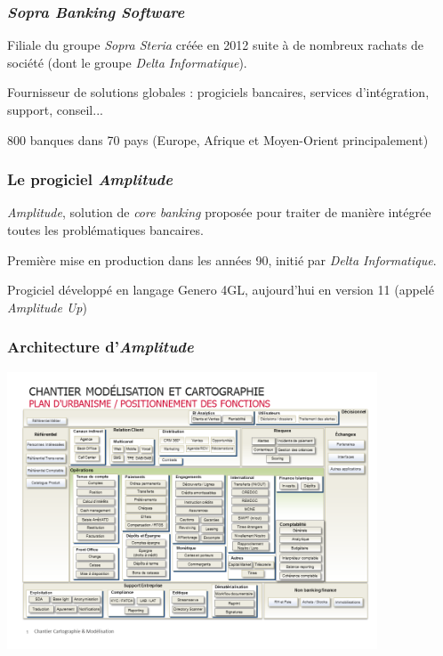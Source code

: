 \documentclass{beamer}
\begin{document}
\begin{frame}
\frametitle{\textit{Sopra Banking Software}}

Filiale du groupe \textit{Sopra Steria} créée en 2012 suite à de nombreux rachats de société (dont le groupe \textit{Delta Informatique}).

\bigbreak

Fournisseur de solutions globales : progiciels bancaires, services d'intégration, support, conseil... 

\bigbreak

800 banques dans 70 pays (Europe, Afrique et Moyen-Orient principalement)

\end{frame}

\begin{frame}
\frametitle{Le progiciel \textit{Amplitude}}

\textit{Amplitude}, solution de \textit{core banking} proposée pour traiter de manière intégrée toutes les problématiques bancaires.

\bigbreak

Première mise en production dans les années 90, initié par \textit{Delta Informatique}.

\bigbreak

Progiciel développé en langage Genero 4GL, aujourd'hui en version 11 (appelé \textit{Amplitude Up})

\end{frame}

\begin{frame}[plain]
\frametitle{Architecture d'\textit{Amplitude}}

\begin{center}
	\includegraphics[width=11cm]{images/Cartographie_fonctionnelle}
\end{center}

\end{frame}
\end{document}
